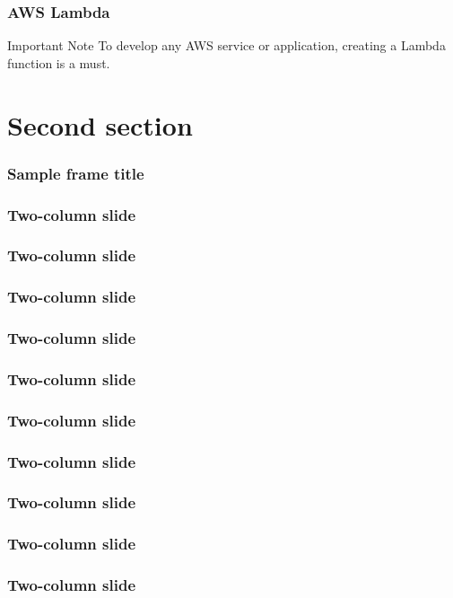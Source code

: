 \documentclass{beamer}
\begin{document}
\begin{frame}
	\frametitle{AWS Lambda}
	\begin{alertblock}{Important Note}
		To develop any AWS service or application, creating a Lambda function is a must.
	\end{alertblock}
	
\end{frame}

\section{Second section}


\begin{frame}
\frametitle{Sample frame title}

\end{frame}

\begin{frame}
\frametitle{Two-column slide}

\end{frame}

\begin{frame}
	\frametitle{Two-column slide}	
\end{frame}

\begin{frame}
	\frametitle{Two-column slide}	
\end{frame}


\begin{frame}
	\frametitle{Two-column slide}	
\end{frame}


\begin{frame}
	\frametitle{Two-column slide}	
\end{frame}


\begin{frame}
	\frametitle{Two-column slide}	
\end{frame}


\begin{frame}
	\frametitle{Two-column slide}	
\end{frame}


\begin{frame}
	\frametitle{Two-column slide}	
\end{frame}


\begin{frame}
	\frametitle{Two-column slide}	
\end{frame}


\begin{frame}
	\frametitle{Two-column slide}	
\end{frame}
\end{document}
